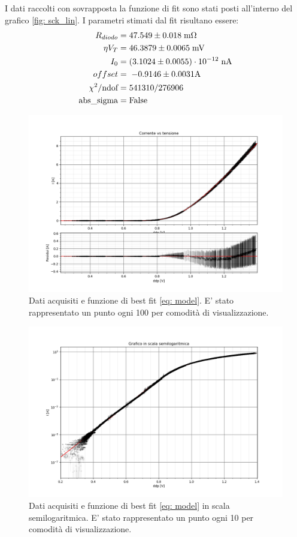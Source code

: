 \documentclass{article}[a4paper, oneside, 11pt]
\begin{document}
I dati raccolti con sovrapposta la funzione di fit sono stati posti all'interno del grafico \ref{fig: sck_lin}.
I parametri stimati dal fit risultano essere:
\begin{align*}
	R_{diodo} &= 47.549 \pm 0.018 \; \rm m\Omega \\
	\eta V_T &= 46.3879 \pm 0.0065 \; \rm mV \\
	I_0 &= (3.1024 \pm 0.0055) \cdot 10^{-12} \; \rm nA \\
	offset &=\; - 0.9146\pm 0.0031\rm A\\
	\chi^2/\text{ndof} &= 541310/276906 \\
	\text{abs\_sigma} &= \rm False
\end{align*}

\begin{figure}[H]
	\centering 
 		\includegraphics[scale=0.5]{./Figure_4_1_Nskip_100.png}
	\caption{Dati acquisiti e funzione di best fit \eqref{eq: model}. E' stato rappresentato un punto ogni 100 per comodità di visualizzazione.}
\end{figure}


\begin{figure}[H]
	\centering 
 		\includegraphics[scale=0.6]{./Figure_3_1_Nskip_10.png}
	\caption{Dati acquisiti e funzione di best fit \eqref{eq: model} in scala semilogaritmica. E' stato rappresentato un punto ogni 10 per comodità di visualizzazione.}
\end{figure}
\end{document}
